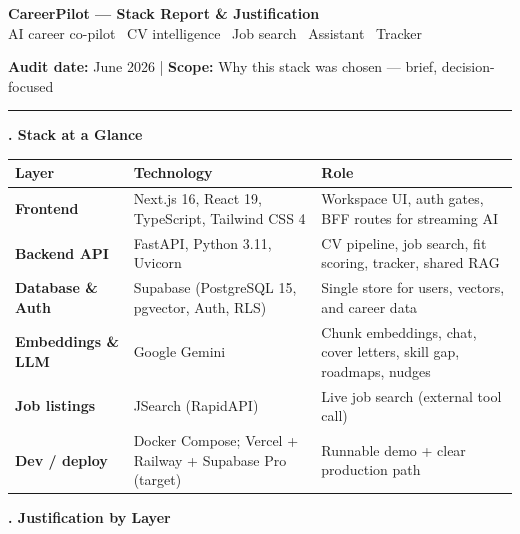 \documentclass[11pt,a4paper]{article}
\newcommand{\sectiontitle}[1]{%
  \vspace{0.9em}%
  \noindent
  \colorbox{sectiontitlebg}{%
    \parbox{\dimexpr\linewidth-2\fboxsep}{%
      \vspace{6pt}%
      {\fontsize{18}{22}\bfseries\selectfont #1}%
      \vspace{6pt}%
    }%
  }%
  \par\vspace{0.55em}%
}
\begin{document}
\begin{center}
  {\LARGE\bfseries CareerPilot --- Stack Report \& Justification}\\[0.5em]
  {\small AI career co-pilot \textbullet\ CV intelligence \textbullet\ Job search \textbullet\ Assistant \textbullet\ Tracker}\\[0.35em]
  \colorbox{taglinebg}{%
    \parbox{0.92\linewidth}{%
      \centering\small
      \textbf{Audit date:} June 2026 \quad|\quad
      \textbf{Scope:} Why this stack was chosen --- brief, decision-focused
    }%
  }
\end{center}
\vspace{0.6em}
\hrule
\vspace{0.5em}

\sectiontitle{1. Stack at a Glance}

\begin{center}
\small
\begin{tabularx}{\linewidth}{|>{\bfseries}l|>{\raggedright\arraybackslash}X|>{\raggedright\arraybackslash}X|}
\hline
Layer & Technology & Role \\
\hline
Frontend & Next.js 16, React 19, TypeScript, Tailwind CSS 4 & Workspace UI, auth gates, BFF routes for streaming AI \\
\hline
Backend API & FastAPI, Python 3.11, Uvicorn & CV pipeline, job search, fit scoring, tracker, shared RAG \\
\hline
Database \& Auth & Supabase (PostgreSQL 15, pgvector, Auth, RLS) & Single store for users, vectors, and career data \\
\hline
Embeddings \& LLM & Google Gemini & Chunk embeddings, chat, cover letters, skill gap, roadmaps, nudges \\
\hline
Job listings & JSearch (RapidAPI) & Live job search (external tool call) \\
\hline
Dev / deploy & Docker Compose; Vercel + Railway + Supabase Pro (target) & Runnable demo + clear production path \\
\hline
\end{tabularx}
\end{center}

\sectiontitle{2. Justification by Layer}
\end{document}
